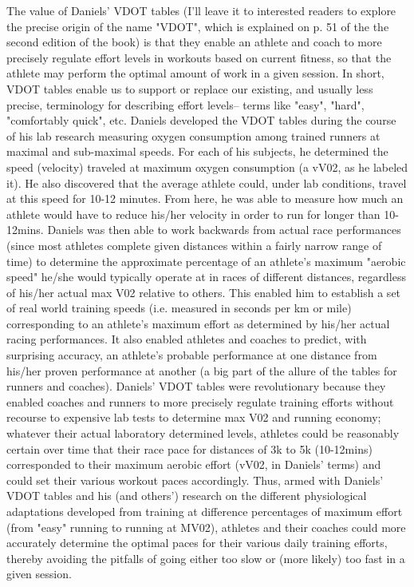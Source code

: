 The value of Daniels' VDOT tables (I'll leave it to interested readers to explore the precise origin of the name "VDOT", which is explained on p. 51 of the the second edition of the book) is that they enable an athlete and coach to more precisely regulate effort levels in workouts based on current fitness, so that the athlete may perform the optimal amount of work in a given session. In short, VDOT tables enable us to support or replace our existing, and usually less precise, terminology for describing effort levels-- terms like "easy", "hard", "comfortably quick", etc. Daniels developed the VDOT tables during the course of his lab research measuring oxygen consumption among trained runners at maximal and sub-maximal speeds. For each of his subjects, he determined the speed (velocity) traveled at maximum oxygen consumption (a vV02, as he labeled it). He also discovered that the average athlete could, under lab conditions, travel at this speed for 10-12 minutes. From here, he was able to measure how much an athlete would have to reduce his/her velocity in order to run for longer than 10-12mins. Daniels was then able to work backwards from actual race performances (since most athletes complete given distances within a fairly narrow range of time) to determine the approximate percentage of an athlete's maximum "aerobic speed" he/she would typically operate at in races of different distances, regardless of his/her actual max V02 relative to others. This enabled him to establish a set of real world training speeds (i.e. measured in seconds per km or mile) corresponding to an athlete's maximum effort as determined by his/her actual racing performances. It also enabled athletes and coaches to predict, with surprising accuracy, an athlete's probable performance at one distance from his/her proven performance at another (a big part of the allure of the tables for runners and coaches). Daniels' VDOT tables were revolutionary because they enabled coaches and runners to more precisely regulate training efforts without recourse to expensive lab tests to determine max V02 and running economy; whatever their actual laboratory determined levels, athletes could be reasonably certain over time that their race pace for distances of 3k to 5k (10-12mins) corresponded to their maximum aerobic effort (vV02, in Daniels' terms) and could set their various workout paces accordingly. Thus, armed with Daniels' VDOT tables and his (and others') research on the different physiological adaptations developed from training at difference percentages of maximum effort (from "easy" running to running at MV02), athletes and their coaches could more accurately determine the optimal paces for their various daily training efforts, thereby avoiding the pitfalls of going either too slow or (more likely) too fast in a given session.

